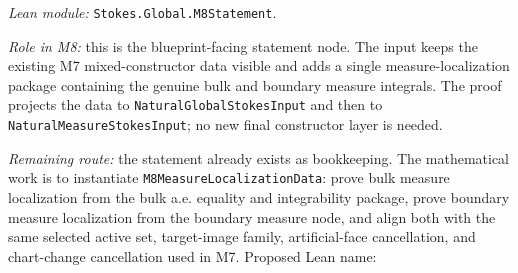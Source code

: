 \begin{theorem}
  \label{anc:m8_measure_level_statement}
  \leanok
  \emph{Lean module:} \texttt{Stokes.Global.M8Statement}.

  \emph{Role in M8:}
  this is the blueprint-facing statement node.  The input keeps the existing
  M7 mixed-constructor data visible and adds a single measure-localization
  package containing the genuine bulk and boundary measure integrals.  The
  proof projects the data to \texttt{NaturalGlobalStokesInput} and then to
  \texttt{NaturalMeasureStokesInput}; no new final constructor layer is needed.

  \emph{Remaining route:}
  the statement already exists as bookkeeping.  The mathematical work is to
  instantiate \texttt{M8MeasureLocalizationData}: prove bulk measure
  localization from the bulk a.e. equality and integrability package, prove
  boundary measure localization from the boundary measure node, and align both
  with the same selected active set, target-image family, artificial-face
  cancellation, and chart-change cancellation used in M7.  Proposed Lean name:
\end{theorem}


